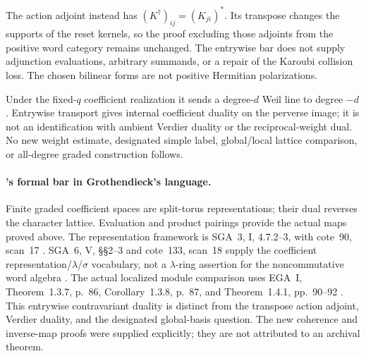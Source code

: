 The action adjoint instead has
$(K^\dagger)_{ij}=(K_{ji})^*$.
Its transpose changes the supports of the reset kernels,
so the  proof excluding those adjoints from
the positive word category remains unchanged.
The entrywise bar does not supply adjunction evaluations,
arbitrary summands, or a repair of the Karoubi collision loss.
The chosen bilinear forms are not positive Hermitian
polarizations.

Under the fixed-$q$ coefficient realization it sends a
degree-$d$ Weil line to degree $-d$.
Entrywise  transport gives internal coefficient
duality on the perverse image; it is not an identification
with ambient Verdier duality or the reciprocal-weight dual.
No new weight estimate, designated simple label, global/local
lattice comparison, or all-degree graded construction follows.

\paragraph{'s formal bar in Grothendieck's language.}
Finite graded coefficient spaces are split-torus
representations; their dual reverses the character lattice.
Evaluation and product pairings provide the actual maps
proved above. The representation framework is SGA~3,
I, 4.7.2--3, with cote~90, scan~17 \cite{SGA3,Archive}.
SGA~6, V, \S\S2--3 and cote~133, scan~18 supply the
coefficient representation/$\lambda$/$\sigma$ vocabulary,
not a $\lambda$-ring assertion for the noncommutative
word algebra \cite{SGA6,Archive}.
The actual localized module comparison uses EGA~I,
Theorem~1.3.7, p.~86, Corollary~1.3.8, p.~87, and
Theorem~1.4.1, pp.~90--92 \cite{EGA}.
This entrywise contravariant duality is distinct from
the transpose action adjoint, Verdier duality, and the
designated global-basis question. The new coherence and
inverse-map proofs were supplied explicitly; they are
not attributed to an archival theorem.
